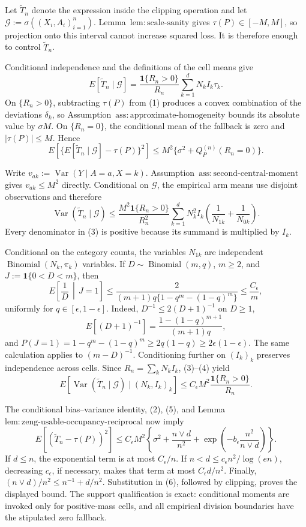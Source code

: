 Let \(\widetilde T_n\) denote the expression inside the clipping operation and let \(\mathcal G:=\sigma((X_i,A_i)_{i=1}^n)\).  Lemma~\(\mathrm{lem:scale\text{-}sanity}\) gives \(\tau(P)\in[-M,M]\), so projection onto this interval cannot increase squared loss.  It is therefore enough to control \(\widetilde T_n\).

Conditional independence and the definitions of the cell means give
\[
 E[\widetilde T_n\mid\mathcal G]
 =\frac{\mathbf 1\{R_n>0\}}{R_n}\sum_{k=1}^dN_kI_k\tau_k.
\tag{1}
\]
On \(\{R_n>0\}\), subtracting \(\tau(P)\) from (1) produces a convex combination of the deviations \(\delta_k\), so Assumption~\(\mathrm{ass:approximate\text{-}homogeneity}\) bounds its absolute value by \(\sigma M\).  On \(\{R_n=0\}\), the conditional mean of the fallback is zero and \(|\tau(P)|\le M\).  Hence
\[
 E\!\left[\{E[\widetilde T_n\mid\mathcal G]-\tau(P)\}^2\right]
 \le M^2\{\sigma^2+Q_P^{(n)}(R_n=0)\}.
\tag{2}
\]

Write \(v_{ak}:=\operatorname{Var}(Y\mid A=a,X=k)\).  Assumption~\(\mathrm{ass:second\text{-}central\text{-}moment}\) gives \(v_{ak}\le M^2\) directly.  Conditional on \(\mathcal G\), the empirical arm means use disjoint observations and therefore
\[
 \operatorname{Var}(\widetilde T_n\mid\mathcal G)
 \le \frac{M^2\mathbf 1\{R_n>0\}}{R_n^2}
 \sum_{k=1}^dN_k^2I_k\left(\frac1{N_{1k}}+\frac1{N_{0k}}\right).
\tag{3}
\]
Every denominator in (3) is positive because its summand is multiplied by \(I_k\).

Conditional on the category counts, the variables \(N_{1k}\) are independent \(\operatorname{Binomial}(N_k,\pi_k)\) variables.  If \(D\sim\operatorname{Binomial}(m,q)\), \(m\ge2\), and \(J:=\mathbf 1\{0<D<m\}\), then
\[
 E\left[\frac1D\,\middle|\,J=1\right]
 \le \frac{2}{(m+1)q\{1-q^m-(1-q)^m\}}
 \le \frac{C_\epsilon}{m},
\tag{4}
\]
uniformly for \(q\in[\epsilon,1-\epsilon]\).  Indeed, \(D^{-1}\le2(D+1)^{-1}\) on \(D\ge1\),
\[
 E[(D+1)^{-1}]=\frac{1-(1-q)^{m+1}}{(m+1)q},
\]
and \(P(J=1)=1-q^m-(1-q)^m\ge2q(1-q)\ge2\epsilon(1-\epsilon)\).  The same calculation applies to \((m-D)^{-1}\).  Conditioning further on \((I_k)_k\) preserves independence across cells.  Since \(R_n=\sum_kN_kI_k\), (3)--(4) yield
\[
 E[\operatorname{Var}(\widetilde T_n\mid\mathcal G)\mid(N_k,I_k)_k]
 \le C_\epsilon M^2\frac{\mathbf 1\{R_n>0\}}{R_n}.
\tag{5}
\]

The conditional bias--variance identity, (2), (5), and Lemma~\(\mathrm{lem:zeng\text{-}usable\text{-}occupancy\text{-}reciprocal}\) now imply
\[
 E[(\widetilde T_n-\tau(P))^2]
 \le C_\epsilon M^2\left\{\sigma^2+\frac{n\vee d}{n^2}
 +\exp\left(-b_\epsilon\frac{n^2}{n\vee d}\right)\right\}.
\tag{6}
\]
If \(d\le n\), the exponential term is at most \(C_\epsilon/n\).  If \(n<d\le c_\epsilon n^2/\log(en)\), decreasing \(c_\epsilon\), if necessary, makes that term at most \(C_\epsilon d/n^2\).  Finally, \((n\vee d)/n^2\le n^{-1}+d/n^2\).  Substitution in (6), followed by clipping, proves the displayed bound.  The support qualification is exact: conditional moments are invoked only for positive-mass cells, and all empirical division boundaries have the stipulated zero fallback.